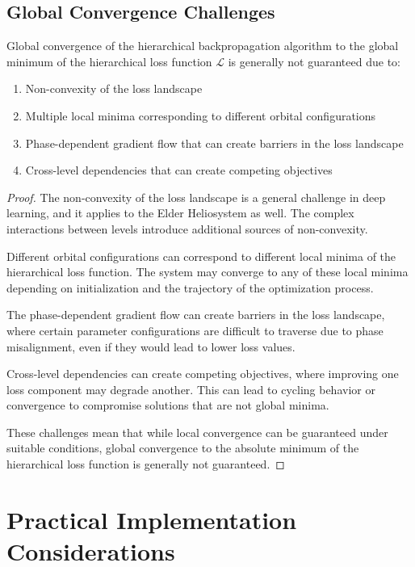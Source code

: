 \subsection{Global Convergence Challenges}

\begin{theorem}
Global convergence of the hierarchical backpropagation algorithm to the global minimum of the hierarchical loss function $\mathcal{L}$ is generally not guaranteed due to:
\begin{enumerate}
    \item Non-convexity of the loss landscape
    \item Multiple local minima corresponding to different orbital configurations
    \item Phase-dependent gradient flow that can create barriers in the loss landscape
    \item Cross-level dependencies that can create competing objectives
\end{enumerate}
\end{theorem}

\begin{proof}
The non-convexity of the loss landscape is a general challenge in deep learning, and it applies to the Elder Heliosystem as well. The complex interactions between levels introduce additional sources of non-convexity.

Different orbital configurations can correspond to different local minima of the hierarchical loss function. The system may converge to any of these local minima depending on initialization and the trajectory of the optimization process.

The phase-dependent gradient flow can create barriers in the loss landscape, where certain parameter configurations are difficult to traverse due to phase misalignment, even if they would lead to lower loss values.

Cross-level dependencies can create competing objectives, where improving one loss component may degrade another. This can lead to cycling behavior or convergence to compromise solutions that are not global minima.

These challenges mean that while local convergence can be guaranteed under suitable conditions, global convergence to the absolute minimum of the hierarchical loss function is generally not guaranteed.
\end{proof}

\section{Practical Implementation Considerations}

